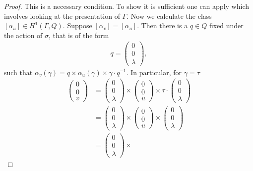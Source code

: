 \begin{proof}
	This is a necessary condition. To show it is sufficient one can apply \cite[Proposition 2]{martin2004nonab} which involves looking at the presentation of $\Gamma$.
	Now we calculate the class $[\alpha_u] \in H^1(\Gamma, Q)$. Suppose $[\alpha_v] = [\alpha_u]$. Then
	there is a $q\in Q$ fixed under the action of $\sigma$, that is of the form
	\begin{align*}
		q = \left(\begin{matrix} 0 \\ 0 \\ \lambda\end{matrix}\right),
	\end{align*}
	such that $\alpha_v(\gamma) = q\times\alpha_u(\gamma)\times\gamma\cdot q^{-1}$. In particular, for $\gamma = \tau$
	\begin{align*}
		\left(\begin{matrix} 0 \\ 0 \\ v\end{matrix}\right) &=
		\left(\begin{matrix} 0 \\ 0 \\ \lambda\end{matrix}\right) \times
		\left(\begin{matrix} 0 \\ 0 \\ u\end{matrix}\right) \times
		\tau\cdot\left(\begin{matrix} 0 \\ 0 \\ \lambda\end{matrix}\right)\\
		&=
		\left(\begin{matrix} 0 \\ 0 \\ \lambda\end{matrix}\right) \times
		\left(\begin{matrix} 0 \\ 0 \\ u\end{matrix}\right) \times
		\left(\begin{matrix} 0 \\ 0 \\ \lambda\end{matrix}\right)\\
		&=
		\left(\begin{matrix} 0 \\ 0 \\ \lambda\end{matrix}\right) \times

\end{align*}
\end{proof}
